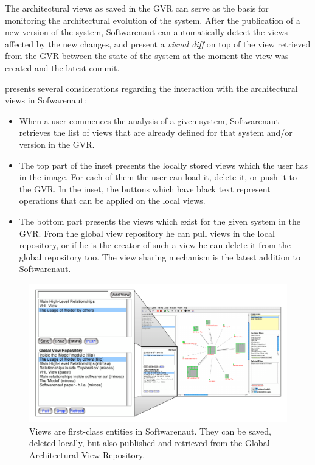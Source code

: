 \documentclass[preprint,12pt]{elsarticle}
\begin{document}
The architectural views as saved in the GVR can serve as the basis for monitoring the architectural evolution of the system. After the publication of a new version of the system, Softwarenaut can automatically detect the views affected by the new changes, and present a {\em visual diff} on top of the view retrieved from the GVR between the state of the system at the moment the view was created and the latest commit.



 presents several considerations regarding the interaction with the architectural views in Sofwarenaut: 

\begin{itemize}

\item When a user commences the analysis of a given system, Softwarenaut retrieves the list of views that are already defined for that system and/or version in the GVR.

\item The top part of the inset presents the locally stored views which the user has in the image. For each of them the user can load it, delete it, or push it to the GVR. In the inset, the buttons which have black text represent operations that can be applied on the local views.

\item The bottom part presents the views which exist for the given system in the GVR. From the global view repository he can pull views in the local repository, or if he is the creator of such a view he can delete it from the global repository too. The view sharing mechanism is the latest addition to Softwarenaut.
\end{itemize}


\begin{figure}[h]
\begin{center}
\includegraphics[width=\linewidth]{ViewOperations}
\caption{Views are first-class entities in Softwarenaut. They can be saved, deleted locally, but also published and retrieved from the Global Architectural View Repository.}
\end{center}
\end{figure}
\end{document}
